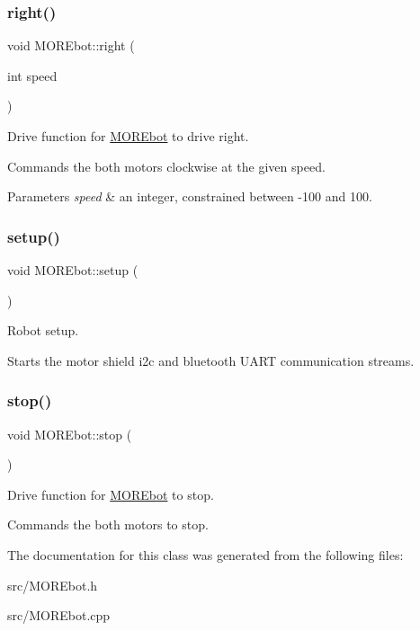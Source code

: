 \subsubsection{\texorpdfstring{right()}{right()}}
{\footnotesize\ttfamily void M\+O\+R\+Ebot\+::right (\begin{DoxyParamCaption}\item[{int}]{speed }\end{DoxyParamCaption})}



Drive function for \mbox{\hyperlink{class_m_o_r_ebot}{M\+O\+R\+Ebot}} to drive right. 

Commands the both motors clockwise at the given speed. 
\begin{DoxyParams}{Parameters}
{\em speed} & an integer, constrained between -\/100 and 100. \\
\hline
\end{DoxyParams}
\mbox{\label{class_m_o_r_ebot_a61fbcee98b031e74de85d9651b4e2133}} 
\subsubsection{\texorpdfstring{setup()}{setup()}}
{\footnotesize\ttfamily void M\+O\+R\+Ebot\+::setup (\begin{DoxyParamCaption}{ }\end{DoxyParamCaption})}



Robot setup. 

Starts the motor shield i2c and bluetooth U\+A\+RT communication streams. \mbox{\label{class_m_o_r_ebot_a53d65a7c2e54c5639c02d6c3872bc90c}} 
\subsubsection{\texorpdfstring{stop()}{stop()}}
{\footnotesize\ttfamily void M\+O\+R\+Ebot\+::stop (\begin{DoxyParamCaption}{ }\end{DoxyParamCaption})}



Drive function for \mbox{\hyperlink{class_m_o_r_ebot}{M\+O\+R\+Ebot}} to stop. 

Commands the both motors to stop. 

The documentation for this class was generated from the following files\+:\begin{DoxyCompactItemize}
\item 
src/M\+O\+R\+Ebot.\+h\item 
src/M\+O\+R\+Ebot.\+cpp\end{DoxyCompactItemize}
